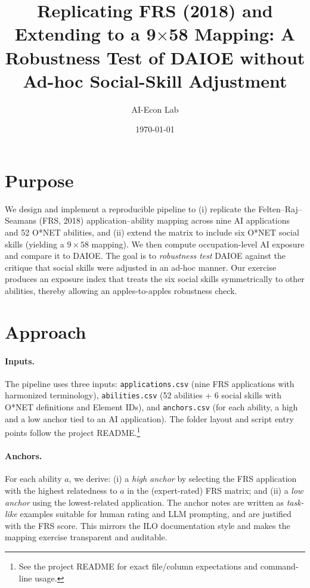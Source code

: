 \documentclass[11pt]{article}
\title{Replicating FRS (2018) and Extending to a 9$\times$58 Mapping: A Robustness Test of DAIOE without Ad-hoc Social-Skill Adjustment}
\author{AI-Econ Lab}
\date{\today}
\begin{document}
\maketitle

\section{Purpose}
We design and implement a reproducible pipeline to (i) replicate the Felten--Raj--Seamans (FRS, 2018) application--ability mapping across nine AI applications and 52 O*NET abilities, and (ii) extend the matrix to include six O*NET social skills (yielding a $9\times 58$ mapping). We then compute occupation-level AI exposure and compare it to DAIOE. The goal is to \emph{robustness test} DAIOE against the critique that social skills were adjusted in an ad-hoc manner. Our exercise produces an exposure index that treats the six social skills symmetrically to other abilities, thereby allowing an apples-to-apples robustness check.

\section{Approach}
\paragraph{Inputs.} The pipeline uses three inputs: \texttt{applications.csv} (nine FRS applications with harmonized terminology), \texttt{abilities.csv} (52 abilities + 6 social skills with O*NET definitions and Element IDs), and \texttt{anchors.csv} (for each ability, a high and a low anchor tied to an AI application). The folder layout and script entry points follow the project README.\footnote{See the project README for exact file/column expectations and command-line usage.}

\paragraph{Anchors.} For each ability $a$, we derive: (i) a \emph{high anchor} by selecting the FRS application with the highest relatedness to $a$ in the (expert-rated) FRS matrix; and (ii) a \emph{low anchor} using the lowest-related application. The anchor notes are written as \emph{task-like} examples suitable for human rating and LLM prompting, and are justified with the FRS score. This mirrors the ILO documentation style and makes the mapping exercise transparent and auditable.
\end{document}
